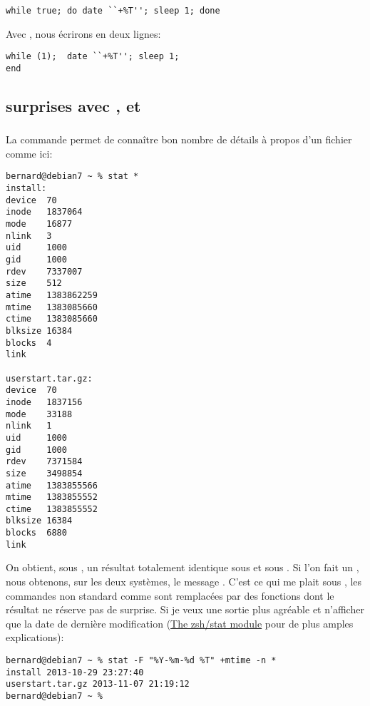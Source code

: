 \begin{lstlisting}
while true; do date ``+%T''; sleep 1; done
\end{lstlisting}

Avec \tcsh{}, nous écrirons en deux lignes:
\begin{lstlisting}
while (1);  date ``+%T''; sleep 1;
end
\end{lstlisting}

\subsection{surprises avec ,  et }

\subsubsection{}
La commande  permet de connaître bon nombre de détails à propos d'un fichier comme ici:

\begin{lstlisting}
bernard@debian7 ~ % stat *
install:
device  70
inode   1837064
mode    16877
nlink   3
uid     1000
gid     1000
rdev    7337007
size    512
atime   1383862259
mtime   1383085660
ctime   1383085660
blksize 16384
blocks  4
link

userstart.tar.gz:
device  70
inode   1837156
mode    33188
nlink   1
uid     1000
gid     1000
rdev    7371584
size    3498854
atime   1383855566
mtime   1383855552
ctime   1383855552
blksize 16384
blocks  6880
link
\end{lstlisting}

On obtient, sous \zsh{}, un résultat totalement identique sous \netbsd{} et sous \linux{}.  Si l'on fait un , nous obtenons, sur les deux systèmes, le message . C'est ce qui me plait sous \zsh{}, les commandes non standard comme  sont remplacées par des fonctions dont le résultat ne réserve pas de surprise.  Si je veux une sortie plus agréable et n'afficher que la date de dernière modification (\cf \href{http://zsh.sourceforge.net/Doc/Release/Zsh-Modules.html#The-zsh_002fstat-Module}{The zsh/stat module} pour de plus amples explications):

\begin{lstlisting}
bernard@debian7 ~ % stat -F "%Y-%m-%d %T" +mtime -n *
install 2013-10-29 23:27:40
userstart.tar.gz 2013-11-07 21:19:12
bernard@debian7 ~ %
\end{lstlisting}

